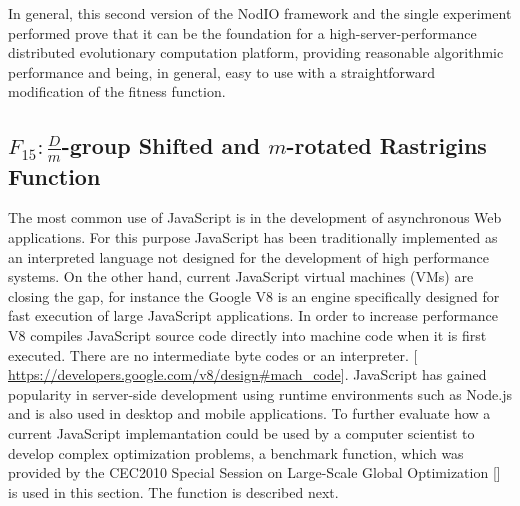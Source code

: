 \documentclass[journal,onecolumn]{IEEEtran}
\begin{document}
In general, this second version of the {\sf NodIO} framework and the
single experiment performed prove that it can be the foundation for a
high-server-performance distributed evolutionary computation platform,
providing reasonable algorithmic performance and being, in general,
easy to use with a straightforward modification of the fitness
function. 


\subsection{$F_{15}:\frac{D}{m}$-group Shifted and $m$-rotated Rastrigins Function}
The most common use of JavaScript is in the development of
asynchronous Web applications. For this purpose JavaScript has
been traditionally implemented as an interpreted language not designed for the
development of high performance systems. On the other hand, current JavaScript 
virtual machines (VMs) are closing the gap, for instance the Google V8 
is an engine specifically designed for fast execution of 
large JavaScript applications. In order to increase performance
V8 compiles JavaScript source code directly into machine code when it is first executed. 
There are no intermediate byte codes or an interpreter.
[\url{ https://developers.google.com/v8/design#mach_code}].
JavaScript has gained popularity in server-side development using runtime
environments such as Node.js and is also used in desktop and mobile applications.
To further evaluate how a current JavaScript implemantation could be used by a
computer scientist to develop complex optimization problems,
a benchmark function, which was provided by the CEC2010 Special Session on
Large-Scale Global Optimization [] is used in this section. 
The function is described next.
\end{document}
